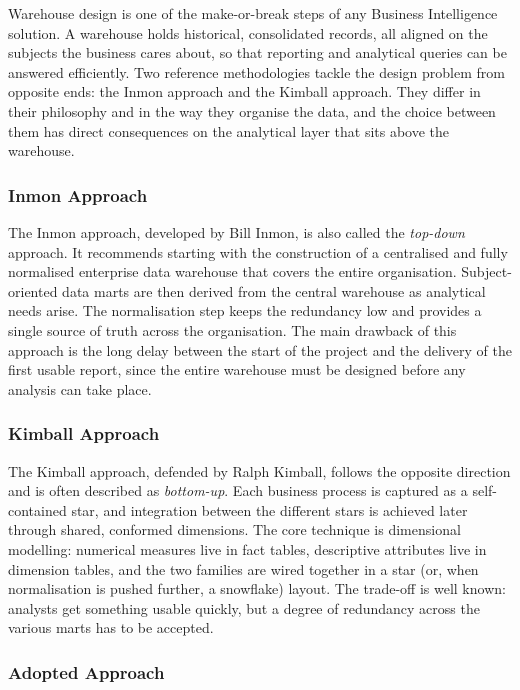 \documentclass[12pt, a4paper]{report}
\begin{document}
Warehouse design is one of the make-or-break steps of any Business
Intelligence solution. A warehouse holds historical, consolidated
records, all aligned on the subjects the business cares about, so
that reporting and analytical queries can be answered efficiently.
Two reference methodologies tackle the design problem from opposite
ends: the Inmon approach and the Kimball approach. They differ in their philosophy
and in the way they organise the data, and the choice between them has
direct consequences on the analytical layer that sits above the warehouse.

\subsubsection{Inmon Approach}

The Inmon approach, developed by Bill Inmon, is also called the
\textit{top-down} approach. It recommends starting with the construction of
a centralised and fully normalised enterprise data warehouse that covers
the entire organisation. Subject-oriented data marts are then derived from
the central warehouse as analytical needs arise. The normalisation step
keeps the redundancy low and provides a single source of truth across the
organisation. The main drawback of this approach is the long delay between
the start of the project and the delivery of the first usable report,
since the entire warehouse must be designed before any analysis can take
place.

\subsubsection{Kimball Approach}

The Kimball approach, defended by Ralph Kimball, follows the opposite
direction and is often described as \textit{bottom-up}. Each business
process is captured as a self-contained star, and integration between the
different stars is achieved later through shared, conformed dimensions.
The core technique is dimensional modelling: numerical measures live in
fact tables, descriptive attributes live in dimension tables, and the two
families are wired together in a star (or, when normalisation is pushed
further, a snowflake) layout. The trade-off is well known: analysts get
something usable quickly, but a degree of redundancy across the various
marts has to be accepted.

\subsubsection{Adopted Approach}
\end{document}
